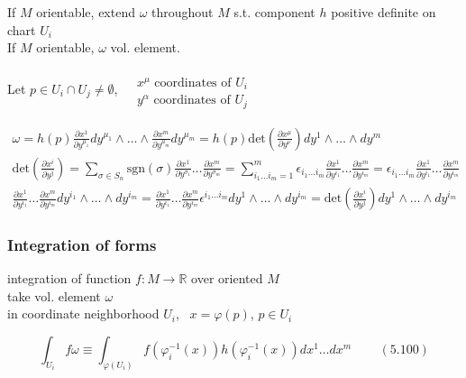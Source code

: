 \documentclass[twoside]{amsart}
\begin{document}
If $M$ orientable, extend $\omega$ throughout $M$ s.t. component $h$ positive definite on chart $U_i$ \\
If $M$ orientable, $\omega$ vol. element. 

Let $p\in U_i \cap U_j \neq \emptyset$, $\begin{aligned} & \quad \\
  & x^{\mu} \text{ coordinates of $U_i$ } \\ 
& y^{\alpha} \text{ coordinates of $U_j$ } \end{aligned}$

\[
\begin{gathered}
  \omega = h(p) \frac{ \partial x^1}{ \partial y^{\mu_1} } dy^{\mu_1} \wedge \dots \wedge \frac{ \partial x^m}{ \partial y^{\mu_m} }dy^{\mu_m} = h(p) \text{det}{ \left( \frac{ \partial x^{\mu} }{ \partial y^{\nu} } \right) } dy^1 \wedge \dots \wedge dy^m \\
 \text{det}{ \left( \frac{ \partial x^i }{ \partial y^j } \right) } = \sum_{ \sigma \in S_n} \text{sgn}{ (\sigma)} \frac{ \partial x^1}{ \partial y^{\sigma_1} } \dots \frac{ \partial x^m}{ \partial y^{\sigma_m}} = \sum^m_{ i_1\dots i_m = 1} \epsilon_{i_1 \dots i_m} \frac{ \partial x^1}{ \partial y^{i_1} } \dots \frac{ \partial x^m}{ \partial y^{i_m} } = \epsilon_{i_1 \dots i_m } \frac{ \partial x^1}{ \partial y^{i_1} } \dots \frac{ \partial x^m}{ \partial y^{i_m}} \\
\frac{ \partial x^1}{ \partial y^{i_1}} \dots \frac{ \partial x^m}{ \partial y^{i_m} } dy^{i_1} \wedge \dots \wedge dy^{i_m} = \frac{ \partial x^1}{ \partial y^{i_1}} \dots \frac{ \partial x^m}{ \partial y^{i_m}} \epsilon^{i_1 \dots i_m} dy^1 \wedge \dots \wedge dy^{i_m} = \text{det}{ \left( \frac{ \partial x^i}{ \partial y^j} \right) } dy^1 \wedge \dots \wedge dy^{i_m}
\end{gathered}
\]




\subsubsection{ Integration of forms }

integration of function $f:M \to \mathbb{R}$ over oriented $M$ \\
take vol. element $\omega$ \\
in coordinate neighborhood $U_i$, \, $x=\varphi(p)$, $p\in U_i$

\begin{equation}
  \int_{U_i} f\omega \equiv \int_{\varphi{ (U_i)} } f(\varphi_i^{-1}(x)) h(\varphi_i^{-1}(x)) dx^1 \dots dx^m \quad \quad \, (5.100)
\end{equation}
\end{document}
